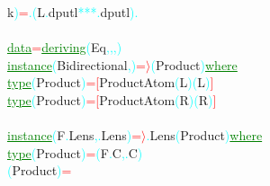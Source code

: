 {\rm{}k}\textcolor{cyan}{)}\hsspace \textcolor{red}{=}\hsspace \textcolor{cyan}{.}\hsspace \textcolor{cyan}{(}{\rm{}L}\textcolor{cyan}{.}{\rm{}dputl}\hsspace \textcolor{cyan}{***}\textcolor{cyan}{.}{\rm{}dputl}\textcolor{cyan}{)}\hsspace \textcolor{cyan}{.}\\\\\textcolor{green}{\underline{data}}\hsspace \textcolor{red}{=}\hsspace \textcolor{green}{\underline{deriving}}\hsspace \textcolor{cyan}{(}{\rm{}Eq}\textcolor{cyan}{,}\textcolor{cyan}{,}\textcolor{cyan}{,}\textcolor{cyan}{)}\\\textcolor{green}{\underline{instance}}\hsspace \textcolor{cyan}{(}{\rm{}Bidirectional}\textcolor{cyan}{,}\textcolor{cyan}{)}\hsspace \textcolor{red}{=\ensuremath{\rangle}}\hsspace \textcolor{cyan}{(}{\rm{}Product}\textcolor{cyan}{)}\hsspace \textcolor{green}{\underline{where}}\\\hstab \textcolor{green}{\underline{type}}\hsspace \textcolor{cyan}{(}{\rm{}Product}\textcolor{cyan}{)}\hsspace \textcolor{red}{=}\hsspace \textcolor{red}{[}{\rm{}ProductAtom}\hsspace \textcolor{cyan}{(}{\rm{}L}\textcolor{cyan}{)}\hsspace \textcolor{cyan}{(}{\rm{}L}\textcolor{cyan}{)}\textcolor{red}{]}\\\hstab \textcolor{green}{\underline{type}}\hsspace \textcolor{cyan}{(}{\rm{}Product}\textcolor{cyan}{)}\hsspace \textcolor{red}{=}\hsspace \textcolor{red}{[}{\rm{}ProductAtom}\hsspace \textcolor{cyan}{(}{\rm{}R}\textcolor{cyan}{)}\hsspace \textcolor{cyan}{(}{\rm{}R}\textcolor{cyan}{)}\textcolor{red}{]}\\\\\textcolor{green}{\underline{instance}}\hsspace \textcolor{cyan}{(}{\rm{}F}\textcolor{cyan}{.}{\rm{}Lens}\textcolor{cyan}{,}\textcolor{cyan}{.}{\rm{}Lens}\textcolor{cyan}{)}\hsspace \textcolor{red}{=\ensuremath{\rangle}}\textcolor{cyan}{.}{\rm{}Lens}\hsspace \textcolor{cyan}{(}{\rm{}Product}\textcolor{cyan}{)}\hsspace \textcolor{green}{\underline{where}}\\\hstab \textcolor{green}{\underline{type}}\hsspace \hsspace \textcolor{cyan}{(}{\rm{}Product}\textcolor{cyan}{)}\hsspace \textcolor{red}{=}\hsspace \textcolor{cyan}{(}{\rm{}F}\textcolor{cyan}{.}{\rm{}C}\textcolor{cyan}{,}\textcolor{cyan}{.}{\rm{}C}\textcolor{cyan}{)}\\\hsspace \textcolor{cyan}{(}{\rm{}Product}\textcolor{cyan}{)}\hsspace \textcolor{red}{=}\hsspace 